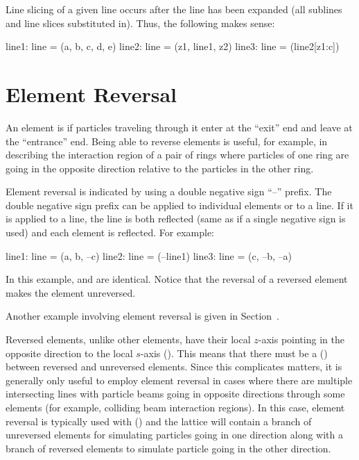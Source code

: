 Line slicing of a given line occurs after the line has been expanded (all sublines and line slices
substituted in). Thus, the following makes sense:
\begin{example}
  line1: line = (a, b, c, d, e)
  line2: line = (z1, line1, z2)
  line3: line = (line2[z1:c])
\end{example}

\section{Element Reversal}
\label{s:ele.reverse}

An element is  if particles traveling through it enter at the ``exit'' end and leave at
the ``entrance'' end. Being able to reverse elements is useful, for example, in describing the
interaction region of a pair of rings where particles of one ring are going in the opposite
direction relative to the particles in the other ring.

Element reversal is indicated by using a double negative sign ``--'' prefix. The double negative
sign prefix can be applied to individual elements or to a line. If it is applied to a line, the line
is both reflected (same as if a single negative sign is used) and each element is reflected. For
example:
\begin{example}
  line1: line = (a, b, --c)
  line2: line = (--line1)
  line3: line = (c, --b, --a)
\end{example}
In this example,  and  are identical. Notice that the reversal of a reversed
element makes the element unreversed.

Another example involving element reversal is given in Section~.

Reversed elements, unlike other elements, have their local $z$-axis pointing in the opposite
direction to the local $s$-axis (). This means that there must be a
 () between reversed and unreversed elements. Since this
complicates matters, it is generally only useful to employ element reversal in cases where there are
multiple intersecting lines with particle beams going in opposite directions through some elements
(for example, colliding beam interaction regions). In this case, element reversal is typically used
with  () and the lattice will contain a branch of unreversed
elements for simulating particles going in one direction along with a branch of reversed elements to
simulate particle going in the other direction.

